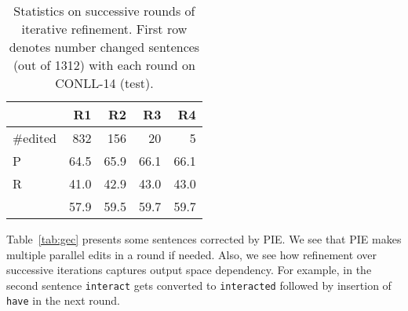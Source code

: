 \documentclass[11pt,a4paper]{article}
\begin{document}
\begin{table}[]
    \centering
    \begin{tabular}{|l|r|r|r|r|} \hline
    
         & R1 & R2 & R3 & R4  \\ \hline
        \#edited & 832 & 156 & 20 & 5  \\ \hline
        P      & 64.5 & 65.9 & 66.1 & 66.1   \\
        R      & 41.0 & 42.9 & 43.0 & 43.0   \\
         & 57.9 & 59.5 & 59.7 & 59.7  \\ \hline
    \end{tabular}
    \caption{Statistics on 
    successive rounds of iterative refinement. First row denotes number changed sentences (out of 1312) with each round on CONLL-14 (test).
    }
    \label{tab:multiround_refinement}
\end{table}{}

Table~\ref{tab:gec} presents some sentences corrected by PIE.  We see that PIE makes multiple parallel edits in a round if needed. Also, we see how refinement over successive iterations captures output space dependency. For example, in the second sentence {\tt interact} gets converted to {\tt interacted} followed by insertion of {\tt have} in the next round. 
\end{document}
